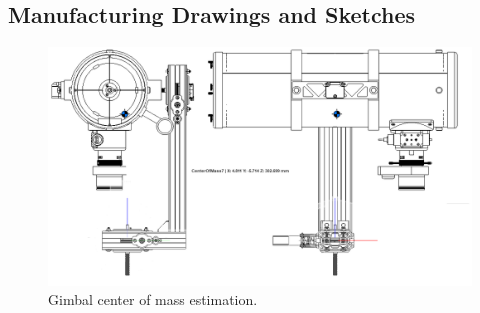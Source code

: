 \newpage
\subsection{Manufacturing Drawings and Sketches}
\label{sec:mech_drawings}

\begin{figure}[H]
	\centering 
	\includegraphics[scale=0.6]{4-experiment-design/img/mechanical/COM.png}
	\caption{Gimbal center of mass estimation.}
	\label{fig::mechanical::COM}
\end{figure}


